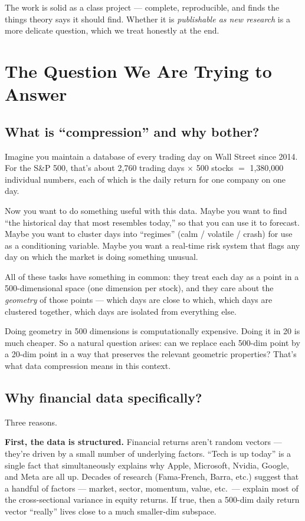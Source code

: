 \documentclass[11pt]{article}
\begin{document}
The work is solid as a class project --- complete, reproducible, and finds the things theory says it should find. Whether it is \emph{publishable as new research} is a more delicate question, which we treat honestly at the end.

\newpage

\section{The Question We Are Trying to Answer}

\subsection{What is ``compression'' and why bother?}

Imagine you maintain a database of every trading day on Wall Street since 2014. For the S\&P 500, that's about 2{,}760 trading days $\times$ 500 stocks $=$ 1{,}380{,}000 individual numbers, each of which is the daily return for one company on one day.

Now you want to do something useful with this data. Maybe you want to find ``the historical day that most resembles today,'' so that you can use it to forecast. Maybe you want to cluster days into ``regimes'' (calm / volatile / crash) for use as a conditioning variable. Maybe you want a real-time risk system that flags any day on which the market is doing something unusual.

All of these tasks have something in common: they treat each day as a point in a 500-dimensional space (one dimension per stock), and they care about the \emph{geometry} of those points --- which days are close to which, which days are clustered together, which days are isolated from everything else.

Doing geometry in 500 dimensions is computationally expensive. Doing it in 20 is much cheaper. So a natural question arises: can we replace each 500-dim point by a 20-dim point in a way that preserves the relevant geometric properties? That's what data compression means in this context.

\subsection{Why financial data specifically?}

Three reasons.

\textbf{First, the data is structured.} Financial returns aren't random vectors --- they're driven by a small number of underlying factors. ``Tech is up today'' is a single fact that simultaneously explains why Apple, Microsoft, Nvidia, Google, and Meta are all up. Decades of research (Fama-French, Barra, etc.) suggest that a handful of factors --- market, sector, momentum, value, etc.~--- explain most of the cross-sectional variance in equity returns. If true, then a 500-dim daily return vector ``really'' lives close to a much smaller-dim subspace.
\end{document}
